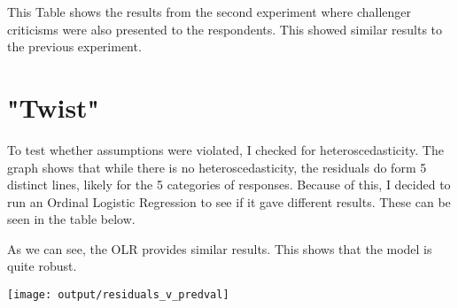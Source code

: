 \documentclass[12pt,letterpaper]{article}
\begin{document}
\renewcommand{\baselinestretch}{1.67}%

This Table shows the results from the second experiment where challenger criticisms were also presented to the respondents. This showed similar results to the previous experiment.

\section{"Twist"}
To test whether assumptions were violated, I checked for heteroscedasticity. The graph shows that while there is no heteroscedasticity, the residuals do form 5 distinct lines, likely for the 5 categories of responses. Because of this, I decided to run an Ordinal Logistic Regression to see if it gave different results. These can be seen in the table below. 

As we can see, the OLR provides similar results. This shows that the model is quite robust.

\texttt{[image: output/residuals\_v\_predval]}

	
	\newpage 
	 	 
\end{document}
